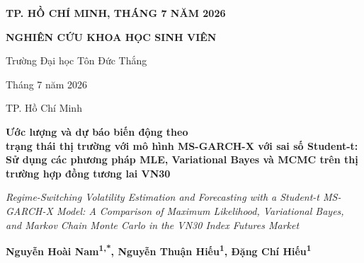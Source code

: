 \documentclass[12pt,a4paper]{article}
\numberwithin{equation}{section}
\newcommand{\TacGiaMot}{Nguyễn Hoài Nam}
\newcommand{\TacGiaHai}{Nguyễn Thuận Hiếu}
\newcommand{\TacGiaBa}{Đặng Chí Hiếu}
\newcommand{\NgayBanThao}{Tháng 7 năm 2026}
\newcommand{\NoiVaThoiGian}{TP. Hồ Chí Minh, tháng 7 năm 2026}
\newcommand{\TieuDeViet}{Ước lượng và dự báo biến động theo \\ trạng thái thị trường với mô hình MS-GARCH-X với sai số Student-t}
\newcommand{\TieuDePhu}{Sử dụng các phương pháp MLE, Variational Bayes và MCMC trên thị trường hợp đồng tương lai VN30}
\newcommand{\TieuDeDayDu}{\TieuDeViet: \TieuDePhu}
\newcommand{\TieuDeAnh}{Regime-Switching Volatility Estimation and Forecasting with a Student-t MS-GARCH-X Model: A Comparison of Maximum Likelihood, Variational Bayes, and Markov Chain Monte Carlo in the VN30 Index Futures Market}
\begin{document}
\begin{titlepage}
    \vfill
    {\fontsize{12pt}{15pt}\selectfont\bfseries \MakeUppercase{\NoiVaThoiGian}\par}
    \vspace{0.55cm}
\end{titlepage}

\begin{titlepage}
    \thispagestyle{empty}

    \vspace*{0.35cm}
    \noindent
    \begin{minipage}[t]{0.64\textwidth}
        {\small\bfseries\color{CoverNavy} NGHIÊN CỨU KHOA HỌC SINH VIÊN}\par
        {\footnotesize\color{JournalGray} Trường Đại học Tôn Đức Thắng}
    \end{minipage}
    \begin{minipage}[t]{0.35\textwidth}
        \raggedleft
        {\footnotesize\color{JournalGray} \NgayBanThao}\par
        {\footnotesize\color{JournalGray} TP. Hồ Chí Minh}
    \end{minipage}

    \vspace{0.35cm}
    \par\noindent{\color{CoverNavy}\rule{\linewidth}{1.1pt}}

    \vspace{1.20cm}
    \begin{center}
        \begin{minipage}{0.92\textwidth}
            \centering
            {\fontsize{22pt}{28pt}\selectfont\bfseries\color{CoverNavy} \TieuDeDayDu\par}
            \vspace{0.70cm}
            {\fontsize{13.5pt}{18pt}\selectfont\itshape \TieuDeAnh\par}
        \end{minipage}
    \end{center}

    \vspace{1.25cm}
    \begin{center}
        {\fontsize{14pt}{18pt}\selectfont\bfseries
        \TacGiaMot\textsuperscript{1,*},
        \TacGiaHai\textsuperscript{1},
        \TacGiaBa\textsuperscript{1}}\par


\end{center}
\end{titlepage}
\end{document}
